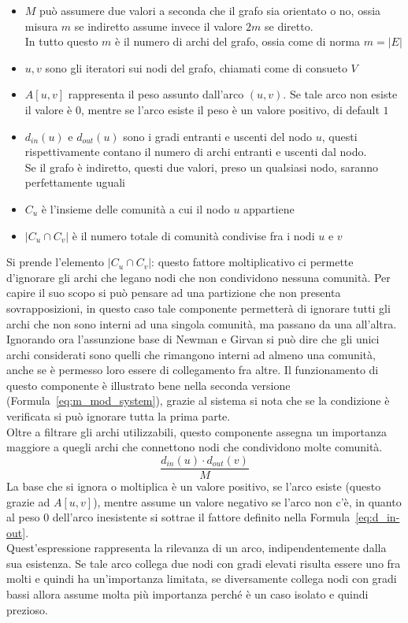 \begin{itemize}
	\item $M$ può assumere due valori a seconda che il grafo sia orientato o no, ossia misura $m$ se indiretto assume invece il valore $2m$ se diretto.\\
	In tutto questo $m$ è il numero di archi del grafo, ossia come di norma $m=|E|$
	\item $u,v$ sono gli iteratori sui nodi del grafo, chiamati come di consueto $V$
	\item $A \left[ u,v \right]$ rappresenta il peso assunto dall'arco $(u, v)$. Se tale arco non esiste il valore è $0$, mentre se l'arco esiste il peso è un valore positivo, di default $1$
	\item $d_{in}\left(u\right)$ e $d_{out}\left(u\right)$ sono i gradi entranti e uscenti del nodo $u$, questi rispettivamente contano il numero di archi entranti e uscenti dal nodo.\\
	Se il grafo è indiretto, questi due valori, preso un qualsiasi nodo, saranno perfettamente uguali
	\item $C_u$ è l'insieme delle comunità a cui il nodo $u$ appartiene
	\item $|C_u \cap C_v|$ è il numero totale di comunità condivise fra i nodi $u$ e $v$
\end{itemize}
%
Si prende l'elemento $ |C_u \cap C_v|$: questo fattore moltiplicativo ci permette d'ignorare gli archi che legano nodi che non condividono nessuna comunità. Per capire il suo scopo si può pensare ad una partizione che non presenta sovrapposizioni, in questo caso tale componente permetterà di ignorare tutti gli archi che non sono interni ad una singola comunità, ma passano da una all'altra. Ignorando ora l'assunzione base di Newman e Girvan  si può dire che gli unici archi considerati sono quelli che rimangono interni ad almeno una comunità, anche se è permesso loro essere di collegamento fra altre. Il funzionamento di questo componente è illustrato bene nella seconda versione (Formula~\ref{eq:m_mod_system}), grazie al sistema si nota che se la condizione è verificata si può ignorare tutta la prima parte.\\
Oltre a filtrare gli archi utilizzabili, questo componente assegna un importanza maggiore a quegli archi che connettono nodi che condividono molte comunità.
\begin{equation}
	\frac{ d_{in}\left(u\right) \cdot d_{out}\left(v\right) }{M}
	\label{eq:d_in-out}
\end{equation}
La base che si ignora o moltiplica è un valore positivo, se l'arco esiste (questo grazie ad $ A \left[ u,v \right]$), mentre assume un valore negativo se l'arco non c'è, in quanto al peso $0$ dell'arco inesistente si sottrae il fattore definito nella Formula~\ref{eq:d_in-out}.\\
Quest'espressione rappresenta la rilevanza di un arco, indipendentemente dalla sua esistenza. Se tale arco collega due nodi con gradi elevati risulta essere uno fra molti e quindi ha un'importanza limitata, se diversamente collega nodi con gradi bassi allora assume molta più importanza perché è un caso isolato e quindi prezioso.
%



